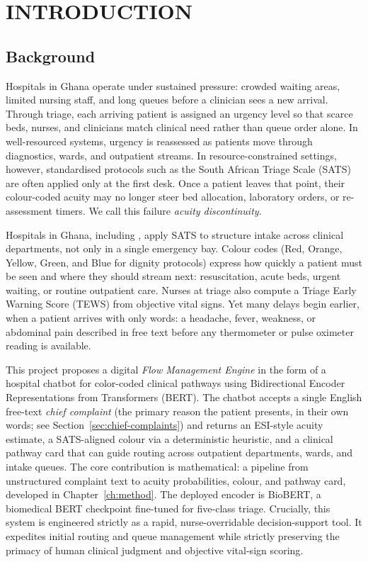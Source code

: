 \chapter{INTRODUCTION}
\label{ch:intro}

\section{Background}

Hospitals in Ghana operate under sustained pressure: crowded waiting areas, limited nursing staff, and long queues before a clinician sees a new arrival. Through triage, each arriving patient is assigned an urgency level so that scarce beds, nurses, and clinicians match clinical need rather than queue order alone. In well-resourced systems, urgency is reassessed as patients move through diagnostics, wards, and outpatient streams. In resource-constrained settings, however, standardised protocols such as the South African Triage Scale (SATS) are often applied only at the first desk. Once a patient leaves that point, their colour-coded acuity may no longer steer bed allocation, laboratory orders, or re-assessment timers. We call this failure \emph{acuity discontinuity}.

Hospitals in Ghana, including \examplehospital{}, apply SATS to structure intake across clinical departments, not only in a single emergency bay. Colour codes (Red, Orange, Yellow, Green, and Blue for dignity protocols) express how quickly a patient must be seen and where they should stream next: resuscitation, acute beds, urgent waiting, or routine outpatient care. Nurses at triage also compute a Triage Early Warning Score (TEWS) from objective vital signs. Yet many delays begin earlier, when a patient arrives with only words: a headache, fever, weakness, or abdominal pain described in free text before any thermometer or pulse oximeter reading is available.

This project proposes a digital \emph{Flow Management Engine} in the form of a hospital chatbot for color-coded clinical pathways using Bidirectional Encoder Representations from Transformers (BERT). The chatbot accepts a single English free-text \emph{chief complaint} (the primary reason the patient presents, in their own words; see Section~\ref{sec:chief-complaints}) and returns an ESI-style acuity estimate, a SATS-aligned colour via a deterministic heuristic, and a clinical pathway card that can guide routing across outpatient departments, wards, and intake queues. The core contribution is mathematical: a pipeline from unstructured complaint text to acuity probabilities, colour, and pathway card, developed in Chapter~\ref{ch:method}. The deployed encoder is BioBERT, a biomedical BERT checkpoint fine-tuned for five-class triage. Crucially, this system is engineered strictly as a rapid, nurse-overridable decision-support tool. It expedites initial routing and queue management while strictly preserving the primacy of human clinical judgment and objective vital-sign scoring.

